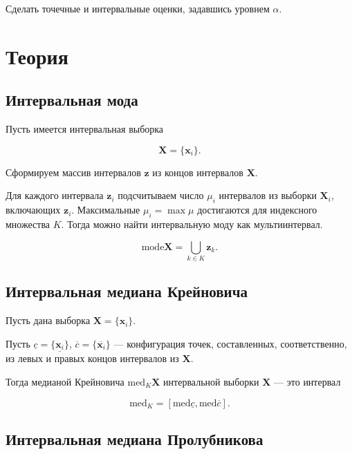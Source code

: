 \documentclass{article}
\begin{document}
  Сделать точечные и интервальные оценки, задавшись уровнем \( \alpha \).

  \section{Теория}

  \subsection{Интервальная мода}

  Пусть имеется интервальная выборка

  \[
    \mathbf{X} = \{ \mathbf{x}_i \}.
  \]

  Сформируем массив интервалов \( \mathbf{z} \) из концов интервалов
  \( \mathbf{X} \).

  Для каждого интервала \( \mathbf{z}_i \) подсчитываем число \( \mu_i \)
  интервалов из выборки \( \mathbf{X}_i \), включающих \( \mathbf{z}_i \).
  Максимальные \( \mu_i = \max \mu \) достигаются для индексного множества
  \( K \). Тогда можно найти интервальную моду как мультиинтервал.

  \begin{equation}
    \text{mode} \mathbf{X} = \bigcup_{k \in K} \mathbf{z}_k.
  \end{equation}

  \subsection{Интервальная медиана Крейновича}

  Пусть дана выборка \( \mathbf{X} = \{ \mathbf{x}_i \} \). 
  
  Пусть
  \( \underline c = \{ \underline{\mathbf{x}_i} \} \),
  \( \overline c = \{ \overline{\mathbf{x}_i} \} \) --- конфигурация
  точек, составленных, соответственно, из левых и правых концов интервалов
  из \( \mathbf{X} \).

  Тогда медианой Крейновича \( \text{med}_K \mathbf{X} \) интервальной
  выборки \( \mathbf{X} \) --- это интервал

  \begin{equation}
    \text{med}_K = [\text{med} \underline c, \text{med} \overline c].
  \end{equation}
  \subsection{Интервальная медиана Пролубникова}
\end{document}
